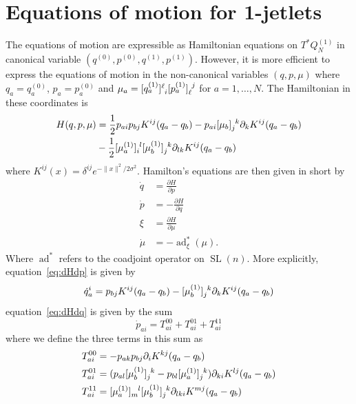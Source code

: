 \documentclass[12pt]{amsart}
\DeclareMathOperator{\SL}{SL}
\DeclareMathOperator{\ad}{ad}
\begin{document}
\section{Equations of motion for 1-jetlets}
\label{sec:eom}

The equations of motion are expressible as Hamiltonian
equations on $T^*Q_N^{(1)}$
in canonical variable $(q^{(0)},p^{(0)},q^{(1)},p^{(1)})$.
However, it is more efficient to express the equations of 
motion in the non-canonical variables $(q,p,\mu)$
where $q_a = q_a^{(0)}$, $p_a = p_a^{(0)}$ and $\mu_a = [q_a^{(1)}]\indices{^\ell_i} [p_a^{(1)}] \indices{_\ell^j}$ for $a = 1,\dots,N$.
The Hamiltonian in these coordinates is
\begin{align*}
  H(q,p,\mu) &=
  \frac{1}{2} p_{a i} p_{b j} K^{i j}(q_a - q_b) - p_{a i}
  [\mu_b]\indices{_{j}^{k}} \partial_k K^{i j}(q_a - q_b) \\
& -\frac{1}{2} [\mu_a^{(1)}]\indices{_{i}^l}
  [\mu_b^{(1)}]\indices{_j^k} \partial_{l k} K^{i j}(q_a - q_b)
\end{align*}
where $K^{i j}(x) = \delta^{i j} e^{- \| x \|^2 / 2 \sigma^2}$.
Hamilton's equations are then given in short by
\begin{align}
  \dot{q} &=  \frac{\partial H}{\partial p} \label{eq:dHdp} \\
  \dot{p} &= -\frac{\partial H}{\partial q} \label{eq:dHdq} \\
  \xi     &=  \frac{\partial H}{\partial \mu} \label{eq:dHdmu} \\
  \dot{\mu} &= - \ad^*_{ \xi } ( \mu ) . \label{eq:LiePoisson}
\end{align}
Where $\ad^*$ refers to the coadjoint operator on $\SL(n)$.
More explicitly, equation~\eqref{eq:dHdp} is given by
\begin{equation*}
  \dot{q}_a^i = p_{b j} K^{i j}(q_a - q_b)
 -[\mu^{(1)}_b] \indices{_j^k} \partial_k K^{i j}(q_a - q_b)
\end{equation*}
equation~\eqref{eq:dHdq} is given by the sum
\begin{equation*}
  \dot{p}_{a i} = T^{00}_{a i} + T^{01}_{a i} + T^{11}_{a i}
\end{equation*}
where we define the three terms in this sum as
\begin{align*}
  T^{00}_{a i} &= -p_{a k} p_{b j} \partial_{i} K^{k j}(q_a - q_b) \\
  T^{01}_{a i} &= (p_{a l}[\mu_b^{(1)}]\indices{_j^k}
                  -p_{b l}[\mu_a^{(1)}]\indices{_j^k}) \partial_{k i} K^{l j}(q_a - q_b) \\
  T^{11}_{a i} &= [\mu_a^{(1)}] \indices{_m^l} [\mu_b^{(1)}]\indices{_j^k}
                  \partial_{l k i} K^{m j}(q_a - q_b) \\
\end{align*}
\end{document}
